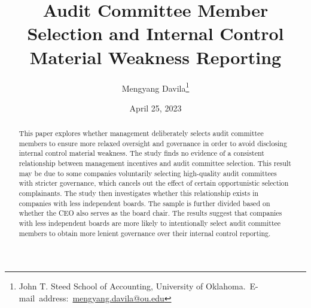 \documentclass[12pt,english]{article}
\begin{document}
\begin{singlespace}
\title{Audit Committee Member Selection and Internal Control Material Weakness Reporting}
\end{singlespace}

\author{Mengyang Davila\thanks{John T. Steed School of Accounting, University of Oklahoma.\
E-mail~address:~\href{mailto:mengyang.davila@ou.edu}{mengyang.davila@ou.edu}}}

\date{April 25, 2023}

\maketitle
\begin{abstract}

\begin{singlespace}
This paper explores whether management deliberately selects audit committee members to ensure more relaxed oversight and governance in order to avoid disclosing internal control material weakness. The study finds no evidence of a consistent relationship between management incentives and audit committee selection. This result may be due to some companies voluntarily selecting high-quality audit committees with stricter governance, which cancels out the effect of certain opportunistic selection complainants. The study then investigates whether this relationship exists in companies with less independent boards. The sample is further divided based on whether the CEO also serves as the board chair. The results suggest that companies with less independent boards are more likely to intentionally select audit committee members to obtain more lenient governance over their internal control reporting.
\end{singlespace}

\end{abstract}
\vfill{}


\pagebreak{}
\end{document}
